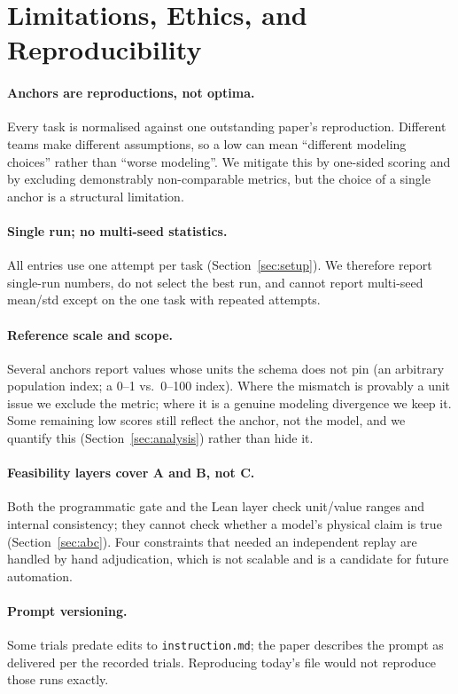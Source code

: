 \section{Limitations, Ethics, and Reproducibility}
\label{sec:limitations}

\paragraph{Anchors are reproductions, not optima.} Every task is normalised against one outstanding paper's reproduction. Different teams make different assumptions, so a low \oeval{} can mean ``different modeling choices'' rather than ``worse modeling''. We mitigate this by one-sided scoring and by excluding demonstrably non-comparable metrics, but the choice of a single anchor is a structural limitation.

\paragraph{Single run; no multi-seed statistics.} All entries use one attempt per task (Section~\ref{sec:setup}). We therefore report single-run numbers, do not select the best run, and cannot report multi-seed mean/std except on the one task with repeated attempts.

\paragraph{Reference scale and scope.} Several anchors report values whose units the schema does not pin (an arbitrary population index; a 0--1 vs.\ 0--100 index). Where the mismatch is provably a unit issue we exclude the metric; where it is a genuine modeling divergence we keep it. Some remaining low scores still reflect the anchor, not the model, and we quantify this (Section~\ref{sec:analysis}) rather than hide it.

\paragraph{Feasibility layers cover A and B, not C.} Both the programmatic gate and the Lean layer check unit/value ranges and internal consistency; they cannot check whether a model's physical claim is true (Section~\ref{sec:abc}). Four constraints that needed an independent replay are handled by hand adjudication, which is not scalable and is a candidate for future automation.

\paragraph{Prompt versioning.} Some trials predate edits to \texttt{instruction.md}; the paper describes the prompt as delivered per the recorded trials. Reproducing today's file would not reproduce those runs exactly.

